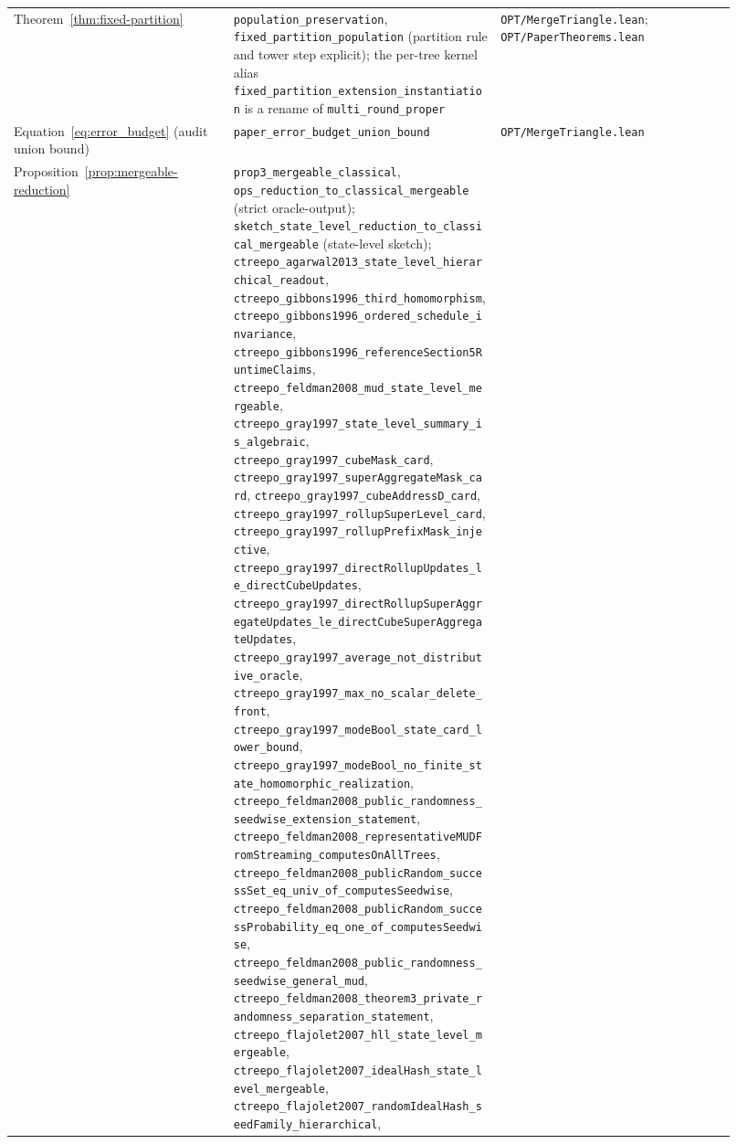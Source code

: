 {\begin{longtable}{p{0.28\linewidth}p{0.34\linewidth}p{0.30\linewidth}}
Theorem~\ref{thm:fixed-partition} &
\texttt{population\_preservation}, \texttt{fixed\_partition\_population}
(partition rule and tower step explicit); the per-tree kernel alias
\texttt{fixed\_partition\_extension\_instantiation} is a rename of
\texttt{multi\_round\_proper} &
\texttt{OPT/MergeTriangle.lean}; \texttt{OPT/PaperTheorems.lean} \\

Equation~\eqref{eq:error_budget} (audit union bound) &
\texttt{paper\_error\_budget\_union\_bound} &
\texttt{OPT/MergeTriangle.lean} \\

Proposition~\ref{prop:mergeable-reduction} &
\texttt{prop3\_mergeable\_classical}, \texttt{ops\_reduction\_to\_classical\_mergeable} (strict oracle-output);
\texttt{sketch\_state\_level\_reduction\_to\_classical\_mergeable} (state-level sketch);
\texttt{ctreepo\_agarwal2013\_state\_level\_hierarchical\_readout},
\texttt{ctreepo\_gibbons1996\_third\_homomorphism},
\texttt{ctreepo\_gibbons1996\_ordered\_schedule\_invariance},
\nolinkurl{ctreepo_gibbons1996_referenceSection5RuntimeClaims},
\texttt{ctreepo\_feldman2008\_mud\_state\_level\_mergeable},
\texttt{ctreepo\_gray1997\_state\_level\_summary\_is\_algebraic},
\texttt{ctreepo\_gray1997\_cubeMask\_card},
\texttt{ctreepo\_gray1997\_superAggregateMask\_card},
\texttt{ctreepo\_gray1997\_cubeAddressD\_card},
\texttt{ctreepo\_gray1997\_rollupSuperLevel\_card},
\texttt{ctreepo\_gray1997\_rollupPrefixMask\_injective},
\nolinkurl{ctreepo_gray1997_directRollupUpdates_le_directCubeUpdates},
\nolinkurl{ctreepo_gray1997_directRollupSuperAggregateUpdates_le_directCubeSuperAggregateUpdates},
\texttt{ctreepo\_gray1997\_average\_not\_distributive\_oracle},
\texttt{ctreepo\_gray1997\_max\_no\_scalar\_delete\_front},
\nolinkurl{ctreepo_gray1997_modeBool_state_card_lower_bound},
\nolinkurl{ctreepo_gray1997_modeBool_no_finite_state_homomorphic_realization},
\texttt{ctreepo\_feldman2008\_public\_randomness\_seedwise\_extension\_statement},
\nolinkurl{ctreepo_feldman2008_representativeMUDFromStreaming_computesOnAllTrees},
\nolinkurl{ctreepo_feldman2008_publicRandom_successSet_eq_univ_of_computesSeedwise},
\nolinkurl{ctreepo_feldman2008_publicRandom_successProbability_eq_one_of_computesSeedwise},
\nolinkurl{ctreepo_feldman2008_public_randomness_seedwise_general_mud},
\texttt{ctreepo\_feldman2008\_theorem3\_private\_randomness\_separation\_statement},
\texttt{ctreepo\_flajolet2007\_hll\_state\_level\_mergeable},
\texttt{ctreepo\_flajolet2007\_idealHash\_state\_level\_mergeable},
\nolinkurl{ctreepo_flajolet2007_randomIdealHash_seedFamily_hierarchical},

\end{longtable}}
